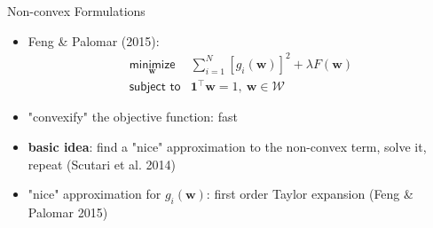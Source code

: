 \documentclass[aspectratio=169]{beamer}
\begin{document}
        \begin{frame}{Non-convex Formulations}
            \vspace{.5cm}
          \begin{itemize}
            \item Feng \& Palomar (2015):
              \begin{equation*}
              \begin{array}{ll}
                \underset{\bm{w}}{\textsf{minimize}} &
                \sum_{i=1}^{N}\left[g_{i}(\bm{w})\right]^2 + \lambda F(\bm{w})\\
                \textsf{subject to} & \mathbf{1}^\top\bm{w} = 1, ~\bm{w} \in \mathcal{W}
              \end{array}
              \end{equation*}
            \end{itemize}
            \begin{itemize}
            \pause
            \item "convexify" the objective function: fast \Laughey
            \vspace{.25cm}
            \pause
            \item \textbf{basic idea}: find a "nice" approximation to the non-convex term, solve it, repeat (Scutari et al. 2014)
            \vspace{.25cm}
            \pause
            \item "nice" approximation for $g_i(\bm{w})$: first order Taylor expansion (Feng \& Palomar 2015)
          \end{itemize}
        \end{frame}
\end{document}
